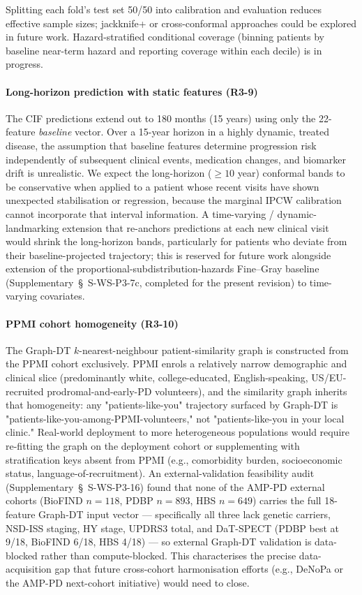 \documentclass[11pt]{article}
\begin{document}
Splitting each fold's test set 50/50 into calibration and evaluation reduces effective sample sizes; jackknife+ or cross-conformal approaches could be explored in future work. Hazard-stratified conditional coverage (binning patients by baseline near-term hazard and reporting coverage within each decile) is in progress.

\paragraph*{Long-horizon prediction with static features (R3-9)} The CIF predictions extend out to 180 months (15 years) using only the 22-feature \emph{baseline} vector. Over a 15-year horizon in a highly dynamic, treated disease, the assumption that baseline features determine progression risk independently of subsequent clinical events, medication changes, and biomarker drift is unrealistic. We expect the long-horizon ($\geq 10$ year) conformal bands to be conservative when applied to a patient whose recent visits have shown unexpected stabilisation or regression, because the marginal IPCW calibration cannot incorporate that interval information. A time-varying / dynamic-landmarking extension that re-anchors predictions at each new clinical visit would shrink the long-horizon bands, particularly for patients who deviate from their baseline-projected trajectory; this is reserved for future work alongside extension of the proportional-subdistribution-hazards Fine--Gray baseline (Supplementary~\S~S-WS-P3-7c, completed for the present revision) to time-varying covariates.

\paragraph*{PPMI cohort homogeneity (R3-10)} The Graph-DT $k$-nearest-neighbour patient-similarity graph is constructed from the PPMI cohort exclusively. PPMI enrols a relatively narrow demographic and clinical slice (predominantly white, college-educated, English-speaking, US/EU-recruited prodromal-and-early-PD volunteers), and the similarity graph inherits that homogeneity: any "patients-like-you" trajectory surfaced by Graph-DT is "patients-like-you-among-PPMI-volunteers," not "patients-like-you in your local clinic." Real-world deployment to more heterogeneous populations would require re-fitting the graph on the deployment cohort or supplementing with stratification keys absent from PPMI (e.g., comorbidity burden, socioeconomic status, language-of-recruitment). An external-validation feasibility audit (Supplementary~\S~S-WS-P3-16) found that none of the AMP-PD external cohorts (BioFIND $n{=}118$, PDBP $n{=}893$, HBS $n{=}649$) carries the full 18-feature Graph-DT input vector --- specifically all three lack genetic carriers, NSD-ISS staging, HY stage, UPDRS3 total, and DaT-SPECT (PDBP best at 9/18, BioFIND 6/18, HBS 4/18) --- so external Graph-DT validation is data-blocked rather than compute-blocked. This characterises the precise data-acquisition gap that future cross-cohort harmonisation efforts (e.g., DeNoPa or the AMP-PD next-cohort initiative) would need to close.
\end{document}
